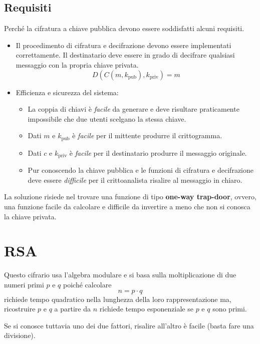 \subsection{Requisiti}
Perch\'e la cifratura a chiave pubblica devono essere soddisfatti alcuni requisiti.
\begin{itemize}
	\item Il procedimento di cifratura e decifrazione devono essere implementati correttamente. Il destinatario deve
	      essere in grado di decifrare qualsiasi messaggio con la propria chiave privata.
	      \[ D(C(m, k_{\text{pub}}), k_{\text{priv}}) = m \]
	\item Efficienza e sicurezza del sistema:
	      \begin{itemize}
		      \item La coppia di chiavi \`e \emph{facile} da generare e deve risultare praticamente impossibile che due
		            utenti scelgano la stessa chiave.
		      \item Dati $m$ e $k_{\text{pub}}$ \`e \emph{facile} per il mittente produrre il crittogramma.
		      \item Dati $c$ e $k_{\text{priv}}$ \`e \emph{facile} per il destinatario produrre il messaggio originale.
		      \item Pur conoscendo la chiave pubblica e le funzioni di cifratura e decifrazione deve essere
		            \emph{difficile} per il crittoanalista risalire al messaggio in chiaro.
	      \end{itemize}
\end{itemize}
La soluzione risiede nel trovare una funzione di tipo \textbf{one-way trap-door}, ovvero, una funzione facile da
calcolare e difficile da invertire a meno che non si conosca la chiave privata.

\section{RSA}
Questo cifrario usa l'algebra modulare e si basa sulla moltiplicazione di due numeri primi $p$ e $q$ poich\'e calcolare
\[ n = p \cdot q \]
richiede tempo quadratico nella lunghezza della loro rappresentazione ma, ricostruire $p$ e $q$ a partire da $n$
richiede tempo esponenziale se $p$ e $q$ sono primi.

Se si conosce tuttavia uno dei due fattori, risalire all'altro \`e facile (basta fare una divisione).

